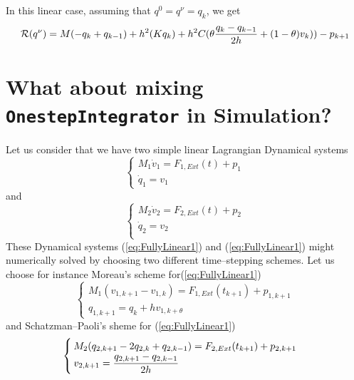 In this linear case, assuming that $q^0=q^\nu = q_k$, we get
\begin{equation}
  \label{eq:residu-linq2}
  \mathcal R(q^\nu) =   M(-q_{k}+q_{k-1})  + h^2 (K q_k)+  h^2 C (\theta \displaystyle \frac{q_k-q_{k-1}}{2h}+ (1-\theta) v_k))  -  p_{k+1}
\end{equation}


\section{What about mixing {\tt OnestepIntegrator} in Simulation?}
\label{Sec:MisingOSI}
Let us consider that we have two simple linear Lagrangian Dynamical systems
\begin{equation}
  \label{eq:FullyLinear1}
  \begin{cases}
    M_1 \dot v_1  = F_{1,Ext}(t) + p_1   \\
    \dot q_1 = v_1 
  \end{cases}
\end{equation}
and
\begin{equation}
  \label{eq:FullyLinear1}
  \begin{cases}
    M_2 \dot v_2   = F_{2,Ext}(t) + p_2  \\
    \dot q_2 = v_2 \\
  \end{cases}
\end{equation}
These Dynamical systems (\ref{eq:FullyLinear1}) and (\ref{eq:FullyLinear1}) might numerically solved by choosing two different time--stepping schemes. Let us choose for instance Moreau's scheme for(\ref{eq:FullyLinear1}) 
\begin{equation}
  \label{eq:FullyLinear1-TS}
  \begin{cases}
    M_1 (v_{1,k+1}-v_{1,k})  = F_{1,Ext}(t_{k+1}) + p_{1,k+1}   \\
    q_{1,k+1} = q_{k}+ h  v_{1,k+\theta} 
  \end{cases}
\end{equation}
and Schatzman--Paoli's sheme for (\ref{eq:FullyLinear1}) 
\begin{equation}
  \label{eq:FullyLinear1-TS}
  \begin{cases}
    M_2(q_{2,k+1}-2q_{2,k}+q_{2,k-1})  = F_{2,Ext}(t_{k+1}) + p_{2,k+1}  \\
    v_{2,k+1} = \displaystyle \frac{q_{2,k+1}-q_{2,k-1}}{2h} \\
  \end{cases}
\end{equation}


